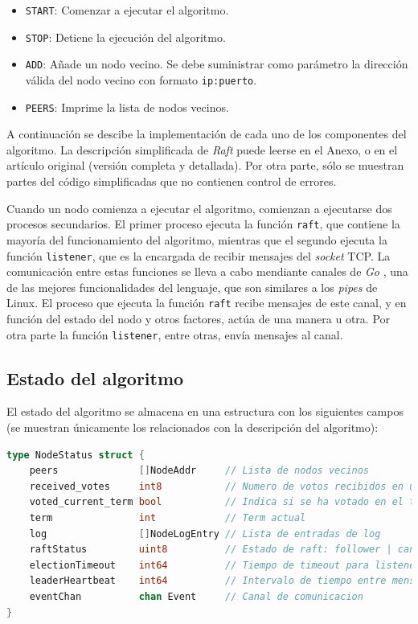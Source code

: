 \newpage

\begin{itemize}
\item\texttt{START}: Comenzar a ejecutar el algoritmo.
\item\texttt{STOP}: Detiene la ejecución del algoritmo.
\item\texttt{ADD}: Añade un nodo vecino. Se debe suministrar como parámetro la dirección válida del nodo vecino con formato \texttt{ip:puerto}.
\item\texttt{PEERS}: Imprime la lista de nodos vecinos.
\end{itemize}

A continuación se descibe la implementación de cada uno de los componentes del algoritmo. La descripción simplificada de \textit{Raft} puede leerse en el Anexo, o en el artículo original \cite{raft1} (versión completa y detallada). Por otra parte, sólo se muestran partes del código simplificadas que no contienen control de errores.

Cuando un nodo comienza a ejecutar el algoritmo, comienzan a ejecutarse dos procesos secundarios. El primer proceso ejecuta la función \texttt{raft}, que contiene la mayoría del funcionamiento del algoritmo, mientras que el segundo ejecuta la función \texttt{listener}, que es la encargada de recibir mensajes del \textit{socket} TCP. La comunicación entre estas funciones se lleva a cabo mendiante canales de \textit{Go} \cite{gochannels}, una de las mejores funcionalidades del lenguaje, que son similares a los \textit{pipes} de Linux. El proceso que ejecuta la función \texttt{raft} recibe mensajes de este canal, y en función del estado del nodo y otros factores, actúa de una manera u otra. Por otra parte la función \texttt{listener}, entre otras, envía mensajes al canal.

\subsection{Estado del algoritmo}

El estado del algoritmo se almacena en una estructura con los siguientes campos (se muestran únicamente los relacionados con la descripción del algoritmo):

\begin{lstlisting}[language=go]
type NodeStatus struct {
	peers              []NodeAddr     // Lista de nodos vecinos
	received_votes     int8           // Numero de votos recibidos en una eleccion
	voted_current_term bool           // Indica si se ha votado en el term acutal
	term               int            // Term actual
	log                []NodeLogEntry // Lista de entradas de log
	raftStatus         uint8          // Estado de raft: follower | candidate | leader
	electionTimeout    int64          // Tiempo de timeout para listener()
	leaderHeartbeat    int64          // Intervalo de tiempo entre mensajes para leaderHeartbeats()
	eventChan          chan Event     // Canal de comunicacion
}
\end{lstlisting}

